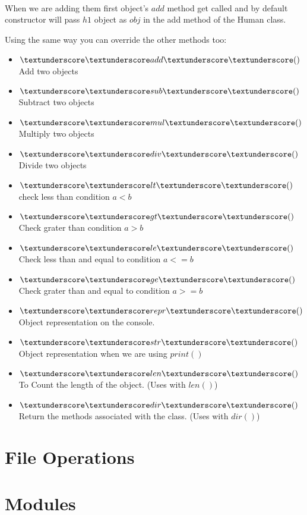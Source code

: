 \documentclass[letterpaper,12pt]{book}
\begin{document}
\paragraph{}
When we are adding them first object's $add$ method get called and by default constructor will pass $h1$ object as $obj$ in the add method of the Human class.

Using the same way you can override the other methods too:
\begin{itemize}
\item  $\textunderscore\textunderscore add \textunderscore\textunderscore()$ Add two objects
\item  $\textunderscore\textunderscore sub \textunderscore\textunderscore()$ Subtract two objects
\item  $\textunderscore\textunderscore mul \textunderscore\textunderscore()$ Multiply two objects
\item  $\textunderscore\textunderscore div \textunderscore\textunderscore()$ Divide two objects
\item  $\textunderscore\textunderscore lt \textunderscore\textunderscore()$ check less than condition $ a < b$
\item  $\textunderscore\textunderscore gt \textunderscore\textunderscore()$ Check grater than condition $ a > b$
\item  $\textunderscore\textunderscore le \textunderscore\textunderscore()$ Check less than and equal to condition $ a <= b$
\item  $\textunderscore\textunderscore ge \textunderscore\textunderscore()$ Check grater than and equal to condition $a >= b$
\item  $\textunderscore\textunderscore repr \textunderscore\textunderscore()$ Object representation on the console.
\item  $\textunderscore\textunderscore str \textunderscore\textunderscore()$ Object representation when we are using $print()$
\item  $\textunderscore\textunderscore len \textunderscore\textunderscore()$ To Count the length of the object. (Uses with $len()$)
\item  $\textunderscore\textunderscore dir \textunderscore\textunderscore()$ Return the methods associated with the class. (Uses with $dir()$)
\end{itemize}
\section{File Operations}
\section{Modules}
\end{document}
